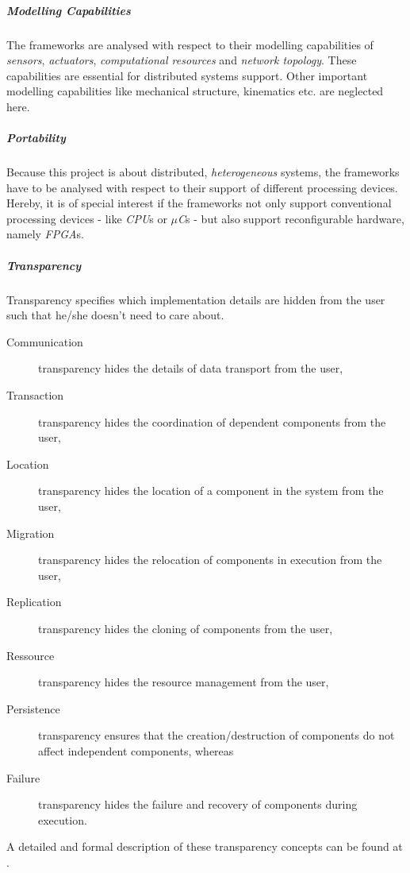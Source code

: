 \documentclass[a4paper,twocolumn]{esapub2005} %
\begin{document}

\subparagraph{Modelling Capabilities}
The frameworks are analysed with respect to their modelling capabilities of \emph{sensors}, \emph{actuators}, \emph{computational resources} and \emph{network topology}.
These capabilities are essential for distributed systems support.
Other important modelling capabilities like mechanical structure, kinematics etc. are neglected here.

\subparagraph{Portability}
Because this project is about distributed, \emph{heterogeneous} systems, the frameworks have to be analysed with respect to their support of different processing devices.
Hereby, it is of special interest if the frameworks not only support conventional processing devices - like \emph{CPU}s or \emph{$\mu$C}s - but also support reconfigurable hardware, namely \emph{FPGA}s.

\subparagraph{Transparency}
Transparency specifies which implementation details are hidden from the user such that he/she doesn't need to care about.
\begin{description}
\item[Communication] transparency hides the details of data transport from the user,
\item[Transaction] transparency hides the coordination of dependent components from the user,
\item[Location] transparency hides the location of a component in the system from the user,
\item[Migration] transparency hides the relocation of components in execution from the user,
\item[Replication] transparency hides the cloning of components from the user,
\item[Ressource] transparency hides the resource management from the user,
\item[Persistence] transparency ensures that the creation/destruction of components do not affect independent components,
whereas \item[Failure] transparency hides the failure and recovery of components during execution.
\end{description}
A detailed and formal description of these transparency concepts can be found at \cite{RM-ODP}.

\end{document}
